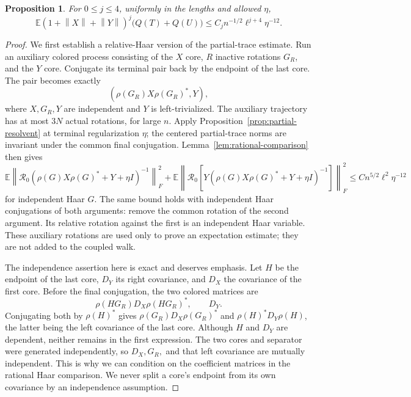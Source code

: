 \documentclass[11pt]{article}
\newtheorem{proposition}[theorem]{Proposition}
\theoremstyle{definition}\newtheorem{definition}[theorem]{Definition}
\theoremstyle{remark}\newtheorem{remark}[theorem]{Remark}
\newcommand{\E}{\mathbb E}
\newcommand{\R}{\mathcal R}
\newcommand{\norm}[1]{\left\lVert#1\right\rVert}
\begin{document}
\begin{proposition}\label{prop:two-block}
For $0\le j\le4$, uniformly in the lengths and allowed $\eta$,
\begin{equation}\label{eq:two-block-resolvent}
 \E(1+\norm X+\norm Y)^j\bigl(Q(T)+Q(U)\bigr)
 \le C_j n^{-1/2}\ell^{j+4}\eta^{-12}.
\end{equation}
\end{proposition}
\begin{proof}
We first establish a relative-Haar version of the partial-trace estimate. Run an auxiliary colored process consisting of the $X$ core, $R$ inactive rotations $G_R$, and the $Y$ core. Conjugate its terminal pair back by the endpoint of the last core. The pair becomes exactly
\[
 (\rho(G_R)X\rho(G_R)^*,Y),
\]
where $X,G_R,Y$ are independent and $Y$ is left-trivialized. The auxiliary trajectory has at most $3N$ actual rotations, for large $n$. Apply Proposition~\ref{prop:partial-resolvent} at terminal regularization $\eta$; the centered partial-trace norms are invariant under the common final conjugation. Lemma~\ref{lem:rational-comparison} then gives
\begin{equation}\label{eq:relative-partial}
 \E\norm{\R_0(\rho(G)X\rho(G)^*+Y+\eta I)^{-1}}_F^2
 +\E\norm{\R_0\!\left[Y(\rho(G)X\rho(G)^*+Y+\eta I)^{-1}\right]}_F^2
 \le C n^{5/2}\ell^2\eta^{-12}
\end{equation}
for independent Haar $G$. The same bound holds with independent Haar conjugations of both arguments: remove the common rotation of the second argument. Its relative rotation against the first is an independent Haar variable. These auxiliary rotations are used only to prove an expectation estimate; they are not added to the coupled walk.

The independence assertion here is exact and deserves emphasis. Let $H$ be the endpoint of the last core, $D_Y$ its right covariance, and $D_X$ the covariance of the first core. Before the final conjugation, the two colored matrices are
\[
 \rho(HG_R)D_X\rho(HG_R)^*,\qquad D_Y.
\]
Conjugating both by $\rho(H)^*$ gives $\rho(G_R)D_X\rho(G_R)^*$ and $\rho(H)^*D_Y\rho(H)$, the latter being the left covariance of the last core. Although $H$ and $D_Y$ are dependent, neither remains in the first expression. The two cores and separator were generated independently, so $D_X,G_R,$ and that left covariance are mutually independent. This is why we can condition on the coefficient matrices in the rational Haar comparison. We never split a core's endpoint from its own covariance by an independence assumption.



\end{proof}
\end{document}
